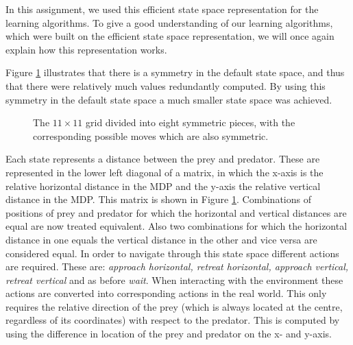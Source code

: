 \documentclass{article}
\begin{document}
In this assignment, we used this efficient state space representation for the learning algorithms. To give a good understanding of our learning algorithms, which were built on the efficient state space representation, we will once again explain how this representation works.

Figure \ref{statespaceSymm} illustrates that there is a symmetry in the default state space, and thus that there were relatively much values redundantly computed.
By using this symmetry in the default state space a much smaller state space was achieved. 

\begin{figure}[htbp]
        \caption{\label{statespaceSymm} The $11 \times 11$ grid divided into eight symmetric pieces, with the corresponding possible moves which are also symmetric.}
\end{figure}

Each state represents a distance between the prey and predator. These are represented in the lower left diagonal of a matrix, in which the x-axis is the relative horizontal distance in the MDP and the y-axis the relative vertical distance in the MDP. This matrix is shown in Figure \ref{statespaceSymm}. Combinations of positions of prey and predator for which the horizontal and vertical distances are equal are now treated equivalent. 
Also two combinations for which the horizontal distance in one equals the vertical distance in the other and vice versa are considered equal. In order to navigate through this state space different actions are required. These are: \textit{approach horizontal, retreat horizontal, approach vertical, retreat vertical} and as before \textit{wait}. When interacting with the environment these actions are converted into corresponding actions in the real world. This only requires the relative direction of the prey (which is always located at the centre, regardless of its coordinates) with respect to the predator. This is computed by using the difference in location of the prey and predator on the x- and y-axis.
\end{document}
